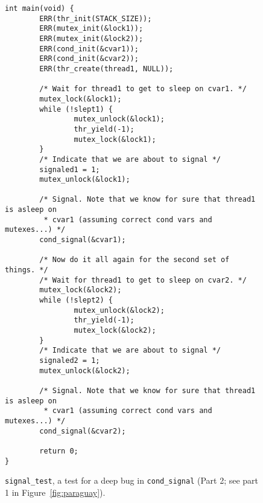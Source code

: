 \documentclass[pldi]{../sigplanconf-pldi15}
\begin{document}
\begin{figure*}
\begin{verbatim}
int main(void) {
        ERR(thr_init(STACK_SIZE));
        ERR(mutex_init(&lock1));
        ERR(mutex_init(&lock2));
        ERR(cond_init(&cvar1));
        ERR(cond_init(&cvar2));
        ERR(thr_create(thread1, NULL));

        /* Wait for thread1 to get to sleep on cvar1. */
        mutex_lock(&lock1);
        while (!slept1) {
                mutex_unlock(&lock1);
                thr_yield(-1);
                mutex_lock(&lock1);
        }
        /* Indicate that we are about to signal */
        signaled1 = 1;
        mutex_unlock(&lock1);

        /* Signal. Note that we know for sure that thread1 is asleep on
         * cvar1 (assuming correct cond vars and mutexes...) */
        cond_signal(&cvar1);

        /* Now do it all again for the second set of things. */
        /* Wait for thread1 to get to sleep on cvar2. */
        mutex_lock(&lock2);
        while (!slept2) {
                mutex_unlock(&lock2);
                thr_yield(-1);
                mutex_lock(&lock2);
        }
        /* Indicate that we are about to signal */
        signaled2 = 1;
        mutex_unlock(&lock2);

        /* Signal. Note that we know for sure that thread1 is asleep on
         * cvar1 (assuming correct cond vars and mutexes...) */
        cond_signal(&cvar2);

        return 0;
}
\end{verbatim}
	\caption{{\tt signal\_test},
	a test for a deep bug in {\tt cond\_signal}
	(Part 2; see part 1 in Figure~\ref{fig:paraguay}).}
	\label{fig:paraguay-pt2}
\end{figure*}
\end{document}

